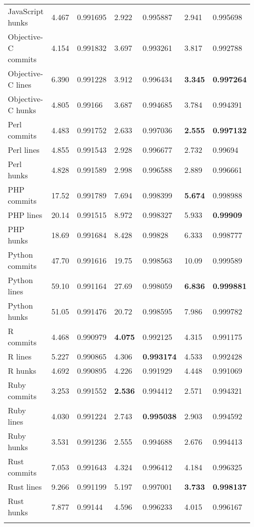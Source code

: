 \documentclass[10pt,journal,compsoc]{IEEEtran}
\begin{document}
\begin{table*}[t!]
\begin{center}
\begin{tabular}{l *{3}{ | *{2}{m{0.09\textwidth}<{\centering}} } }
JavaScript hunks & 4.467 & 0.991695 & 2.922 & 0.995887 & 2.941 & 0.995698 \\ \hdashline
Objective-C commits & 4.154 & 0.991832 & 3.697 & 0.993261 & 3.817 & 0.992788 \\
Objective-C lines & 6.390 & 0.991228 & 3.912 & 0.996434 & {\bf 3.345} & {\bf 0.997264} \\
Objective-C hunks & 4.805 & 0.99166 & 3.687 & 0.994685 & 3.784 & 0.994391 \\ \hdashline
Perl commits & 4.483 & 0.991752 & 2.633 & 0.997036 & {\bf 2.555} & {\bf 0.997132} \\
Perl lines & 4.855 & 0.991543 & 2.928 & 0.996677 & 2.732 & 0.99694 \\
Perl hunks & 4.828 & 0.991589 & 2.998 & 0.996588 & 2.889 & 0.996661 \\ \hdashline
PHP commits & 17.52 & 0.991789 & 7.694 & 0.998399 & {\bf 5.674} & 0.998988 \\
PHP lines & 20.14 & 0.991515 & 8.972 & 0.998327 & 5.933 & {\bf 0.99909} \\
PHP hunks & 18.69 & 0.991684 & 8.428 & 0.99828 & 6.333 & 0.998777 \\ \hdashline
Python commits & 47.70 & 0.991616 & 19.75 & 0.998563 & 10.09 & 0.999589 \\
Python lines & 59.10 & 0.991164 & 27.69 & 0.998059 & {\bf 6.836} & {\bf 0.999881} \\
Python hunks & 51.05 & 0.991476 & 20.72 & 0.998595 & 7.986 & 0.999782 \\ \hdashline
R commits & 4.468 & 0.990979 & {\bf 4.075} & 0.992125 & 4.315 & 0.991175 \\
R lines & 5.227 & 0.990865 & 4.306 & {\bf 0.993174} & 4.533 & 0.992428 \\
R hunks & 4.692 & 0.990895 & 4.226 & 0.991929 & 4.448 & 0.991069 \\ \hdashline
Ruby commits & 3.253 & 0.991552 & {\bf 2.536} & 0.994412 & 2.571 & 0.994321 \\
Ruby lines & 4.030 & 0.991224 & 2.743 & {\bf 0.995038} & 2.903 & 0.994592 \\
Ruby hunks & 3.531 & 0.991236 & 2.555 & 0.994688 & 2.676 & 0.994413 \\ \hdashline
Rust commits & 7.053 & 0.991643 & 4.324 & 0.996412 & 4.184 & 0.996325 \\
Rust lines & 9.266 & 0.991199 & 5.197 & 0.997001 & {\bf 3.733} & {\bf 0.998137} \\
Rust hunks & 7.877 & 0.99144 & 4.596 & 0.996233 & 4.015 & 0.996167 \\ \hdashline

\end{tabular}
\end{center}
\end{table*}
\end{document}
